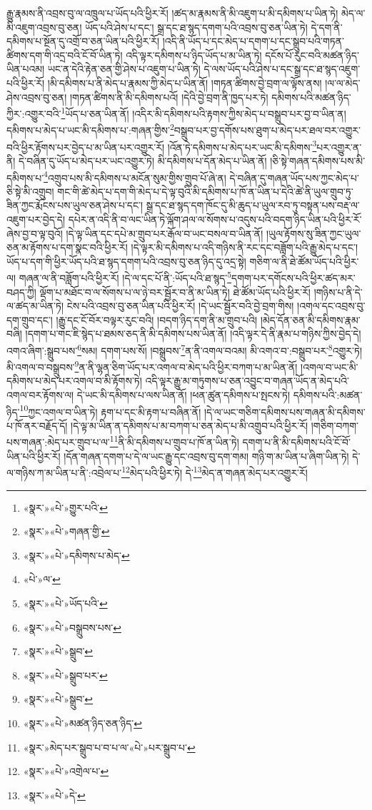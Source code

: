 རྒྱུ་རྣམས་ནི་འབྲས་བུ་ལ་འཁྲུལ་པ་ཡོད་པའི་ཕྱིར་རོ། །ཚད་མ་རྣམས་ནི་མི་འཇུག་པ་མི་དམིགས་པ་ཡིན་ཏེ། མེད་ལ་མི་འཇུག་འབྲས་བུ་ཅན། ཡོད་པའི་ཤེས་པ་དང་། སྒྲ་དང་ཐ་སྙད་དགག་པའི་འབྲས་བུ་ཅན་ཡིན་ཏེ། དེ་དག་ནི་དམིགས་པ་སྔོན་དུ་འགྲོ་བ་ཅན་ཡིན་པའི་ཕྱིར་རོ། །འདི་ནི་ཡོད་པ་དང་མེད་པ་དགག་པ་དང་སྒྲུབ་པའི་གཏན་ཚིགས་དག་གི་འདྲ་བའི་ངོ་བོ་ཡིན་ཏེ། འདི་ལྟར་དམིགས་པ་ཉིད་ཡོད་པ་མ་ཡིན་ཏེ། དངོས་པོ་རུང་བའི་མཚན་ཉིད་ཡིན་པའམ། ཡང་ན་དེའི་རྟེན་ཅན་གྱི་ཤེས་པ་འཇུག་པ་ཡིན་ཏེ། དེ་ལས་ཡོད་པའི་ཤེས་པ་དང་སྒྲ་དང་ཐ་སྙད་འཇུག་པའི་ཕྱིར་རོ། །མི་དམིགས་པ་ནི་མེད་པ་རྣམས་ཀྱི་མེད་པ་ཡིན་ནོ། །གཏན་ཚིགས་བྱེ་བྲག་ལ་ལྟོས་ནས། །ལ་ལ་མེད་ཤེས་འབྲས་བུ་ཅན། །གཏན་ཚིགས་ནི་མི་དམིགས་པའོ། །དེའི་བྱེ་བྲག་ནི་ཁྱད་པར་ཏེ། དམིགས་པའི་མཚན་ཉིད་ཀྱིར་:འགྱུར་བའི་\footnote{«སྣར་»«པེ་»གྱུར་པའི་}ཡོད་པ་ཅན་ཡིན་ནོ། །འདིར་མི་དམིགས་པའི་རྟགས་ཀྱིས་མེད་པ་བསྒྲུབ་པར་བྱ་བ་ཡིན་ན། དམིགས་པ་མེད་པ་ཡང་མི་དམིགས་པ་:གཞན་གྱིས་\footnote{«སྣར་»«པེ་»གཞན་གྱི་}བསྒྲུབ་པར་བྱ་དགོས་པས་ཐུག་པ་མེད་པར་ཐལ་བར་འགྱུར་བའི་ཕྱིར་རྟོགས་པར་བྱེད་པ་མ་ཡིན་པར་འགྱུར་རོ། །འོན་ཏེ་དམིགས་པ་མེད་པར་ཡང་མི་དམིགས་\footnote{«སྣར་»«པེ་»དམིགས་པ་མེད་}པར་འགྱུར་ན་ནི། དེ་བཞིན་དུ་ཡོད་པ་མེད་པར་ཡང་འགྱུར་ཏེ། མི་དམིགས་པ་དོན་མེད་པ་ཡིན་ནོ། །ཅི་སྟེ་གཞན་དམིགས་པས་མི་དམིགས་པ་\footnote{«པེ་»ལ་}འགྲུབ་པས་མི་དམིགས་པ་མངོན་སུམ་གྱིས་གྲུབ་པོ་ཞེ་ན། དེ་བཞིན་དུ་གཞན་ཡོད་པས་ཀྱང་མེད་པ་ཅི་སྟེ་མི་འགྲུབ། གང་གི་ཚེ་མེད་པ་དག་གི་མེད་པ་དེ་ལྟ་བུའི་མི་དམིགས་པ་ཁོ་ན་ཡིན་པ་དེའི་ཚེ་ནི་ཡུལ་གྲུབ་ཏུ་ཟིན་ཀྱང་རྨོངས་པས་ཡུལ་ཅན་ཤེས་པ་དང་། སྒྲ་དང་ཐ་སྙད་དག་ཁོང་དུ་མི་ཆུད་པ་ཡུལ་རབ་ཏུ་བསྟན་པས་བརྡ་ལ་འཇུག་པར་བྱེད་དེ། དཔེར་ན་འདི་ནི་བ་ལང་ཡིན་ཏེ་ལྐོག་ཤལ་ལ་སོགས་པ་འདུས་པའི་བདག་ཉིད་ཡིན་པའི་ཕྱིར་རོ་ཞེས་བྱ་བ་ལྟ་བུའོ། །དེ་ལྟ་ཡིན་དང་དཔེ་མ་གྲུབ་པར་རྒོལ་བ་ཡང་བསལ་བ་ཡིན་ནོ། །ཡུལ་རྟོགས་སུ་ཟིན་ཀྱང་ཡུལ་ཅན་མ་རྟོགས་པ་དག་སྣང་བའི་ཕྱིར་རོ། །དེ་ལྟར་མི་དམིགས་པ་འདི་གཉིས་ནི་རང་དང་བཟློག་པའི་རྒྱུ་མེད་པ་དང་། ཡོད་པ་དག་གི་ཕྱིར་ཡོད་པའི་ཐ་སྙད་དགག་པའི་འབྲས་བུ་ཅན་ཉིད་དུ་འདྲ་སྟེ། གཅིག་ལ་ནི་ཐེ་ཚོམ་ཡོད་པའི་ཕྱིར་ལ། གཞན་ལ་ནི་བཟློག་པའི་ཕྱིར་རོ། །དེ་ལ་དང་པོ་ནི་:ཡོད་པའི་ཐ་སྙད་\footnote{«སྣར་»«པེ་»ཡོད་པའི་}དགག་པར་དགོངས་པའི་ཕྱིར་ཚད་མར་བཤད་ཀྱི། ལྡོག་པ་མཐོང་བ་ལ་སོགས་པ་ལ་ཉེ་བར་སྦྱོར་བ་ནི་མ་ཡིན་ཏེ། ཐེ་ཚོམ་ཡོད་པའི་ཕྱིར་རོ། །གཉིས་པ་ནི་དེ་ལ་ཚད་མ་ཡིན་ཏེ། ངེས་པའི་འབྲས་བུ་ཅན་ཡིན་པའི་ཕྱིར་རོ། །དེ་ཡང་སྦྱོར་བའི་བྱེ་བྲག་གིས། །འགལ་དང་འབྲས་བུ་དག་གྲུབ་དང་། །རྒྱུ་དང་ངོ་བོར་བལྟར་རུང་བའི། །བདག་ཉིད་དག་ནི་མ་གྲུབ་པའི། །མེད་དོན་ཅན་མི་དམིགས་རྣམ་བཞི། །དགག་པ་གང་ཇི་སྙེད་པ་ཐམས་ཅད་ནི་མི་དམིགས་པས་ཡིན་ནོ། །འདི་ལྟར་དེ་ནི་རྣམ་པ་གཉིས་ཀྱིས་བྱེད་དེ། འགའ་ཞིག་:སྒྲུབ་པས་\footnote{«སྣར་»«པེ་»བསྒྲུབས་པས་}སམ། དགག་པས་སོ། །བསྒྲུབས་\footnote{«སྣར་»«པེ་»སྒྲུབ་}ན་ནི་འགལ་བའམ། མི་འགའ་བ་:བསྒྲུབ་པར་\footnote{«སྣར་»«པེ་»སྒྲུབ་པར་}འགྱུར་ཏེ། མི་འགལ་བ་བསྒྲུབས་\footnote{«སྣར་»«པེ་»སྒྲུབ་}ན་ནི་ལྷན་ཅིག་ཡོད་པར་འགལ་བ་མེད་པའི་ཕྱིར་བཀག་པ་མ་ཡིན་ནོ། །འགལ་བ་ཡང་མི་དམིགས་པ་མེད་པར་འགལ་བ་མི་རྟོགས་ཏེ། འདི་ལྟར་རྒྱུ་མ་གཏུགས་པ་ཅན་འབྱུང་བ་གཞན་ཡོད་ན་མེད་པའི་འགལ་བར་རྟོགས་ལ། དེ་ཡང་མི་དམིགས་པ་ལས་ཡིན་ནོ། །ཕན་ཚུན་དམིགས་པ་སྤངས་ཏེ། དམིགས་པའི་:མཚན་ཉིད་\footnote{«སྣར་»«པེ་»མཚན་ཉིད་ཅན་ཉིད་}ཀྱང་འགལ་བ་ཡིན་ཏེ། རྟག་པ་དང་མི་རྟག་པ་བཞིན་ནོ། །དེ་ལ་ཡང་གཅིག་དམིགས་པས་གཞན་མི་དམིགས་པ་ཁོ་ནར་བརྗོད་དོ། །དེ་ལྟ་མ་ཡིན་ན་དམིགས་པ་མ་བཀག་པ་ཅན་མེད་པ་མི་འགྲུབ་པའི་ཕྱིར་རོ། །གཅིག་བཀག་པས་གཞན་:མེད་པར་གྲུབ་པ་ལ་\footnote{«སྣར་»མེད་པར་སྒྲུབ་པ་བ་པ་ལ་«པེ་»པར་སྒྲུབ་པ་}ནི་མི་དམིགས་པ་གྲུབ་པ་ཁོ་ན་ཡིན་ཏེ། དགག་པ་ནི་མི་དམིགས་པའི་ངོ་བོ་ཡིན་པའི་ཕྱིར་རོ། །དོན་གཞན་དགག་པ་དེ་ལ་ཡང་རྒྱུ་དང་འབྲས་བུ་དག་གམ། གཉི་ག་མ་ཡིན་པ་ཞིག་ཡིན་ཏེ། དེ་ལ་གཉིས་ཀ་མ་ཡིན་པ་ནི་:འབྲེལ་པ་\footnote{«སྣར་»«པེ་»འགྲེལ་པ་}མེད་པའི་ཕྱིར་ཏེ། དེ་\footnote{«སྣར་»«པེ་»དེ་}མེད་ན་གཞན་མེད་པར་འགྱུར་རོ། 